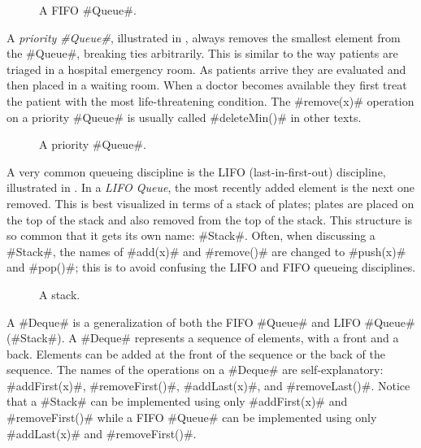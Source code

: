 \begin{figure}
  \caption[A FIFO queue]{A FIFO #Queue#.}
\end{figure}

A \emph{priority #Queue#}, illustrated in , always
removes the smallest element from the #Queue#, breaking ties arbitrarily.
This is similar to the way patients are triaged in a hospital emergency
room.  As patients arrive they are evaluated and then placed in a waiting
room.  When a doctor becomes available they first treat the patient with
the most life-threatening condition.  The #remove(x)# operation on a
priority #Queue# is usually called #deleteMin()# in other texts.

\begin{figure}
  \caption[A priority queue]{A priority #Queue#.}
\end{figure}


A very common queueing discipline is the LIFO (last-in-first-out)
discipline, illustrated in .  In a \emph{LIFO Queue},
the most recently added element is the next one removed.  This is best
visualized in terms of a stack of plates; plates are placed on the top of
the stack and also removed from the top of the stack. This structure is
so common that it gets its own name: #Stack#.  Often, when discussing a
#Stack#, the names of #add(x)# and #remove()# are changed to #push(x)#
and #pop()#; this is to avoid confusing the LIFO and FIFO queueing
disciplines.

\begin{figure}
  \caption[A stack]{A stack.}
\end{figure}


A #Deque# is a generalization of both the FIFO #Queue# and LIFO #Queue#
(#Stack#).   A #Deque# represents a sequence of elements, with a front
and a back.  Elements can be added at the front of the sequence or
the back of the sequence.  The names of the operations on a #Deque#
are self-explanatory: #addFirst(x)#, #removeFirst()#, #addLast(x)#,
and #removeLast()#.  Notice that a #Stack# can be implemented using only
#addFirst(x)# and #removeFirst()# while a FIFO #Queue# can be implemented
using only #addLast(x)# and #removeFirst()#.


